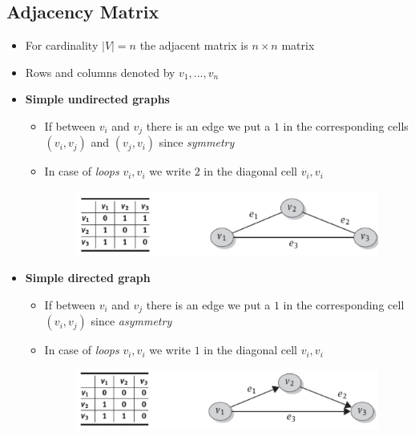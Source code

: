 \subsection{Adjacency Matrix}
\begin{itemize}
    \item For cardinality \(|V| = n\) the adjacent matrix is \(n \times n\) matrix
    \item Rows and columns denoted by \(v_1,...,v_n\)
    \item \textbf{Simple undirected graphs}
    \begin{itemize}
        \item If between \(v_i\) and \(v_j\) there is an edge we put a \(1\) in the corresponding cells \((v_i, v_j)\) and \((v_j, v_i)\) since \textit{symmetry}
        \item In case of \textit{loops} \(v_i, v_i\) we write \(2\) in the diagonal cell  \(v_i, v_i\)
        
        \begin{figure}[!h]
        \centering
        \includegraphics[width=0.7\linewidth]{images/AdvancedDataManagment/graph_databases/adj_matrix_simple_undirected.jpeg}
        \end{figure}
        
    \end{itemize}
    \item \textbf{Simple directed graph}
    \begin{itemize}
        \item If between \(v_i\) and \(v_j\) there is an edge we put a \(1\) in the corresponding cell \((v_i, v_j)\) since \textit{asymmetry}
        \item In case of \textit{loops} \(v_i, v_i\) we write \(1\) in the diagonal cell \(v_i, v_i\)
    
        \begin{figure}[!h]
        \centering
        \includegraphics[width=0.7\linewidth]{images/AdvancedDataManagment/graph_databases/adj_matrix_simple_directed.jpeg}
        \end{figure}
        

\end{itemize}
\end{itemize}
